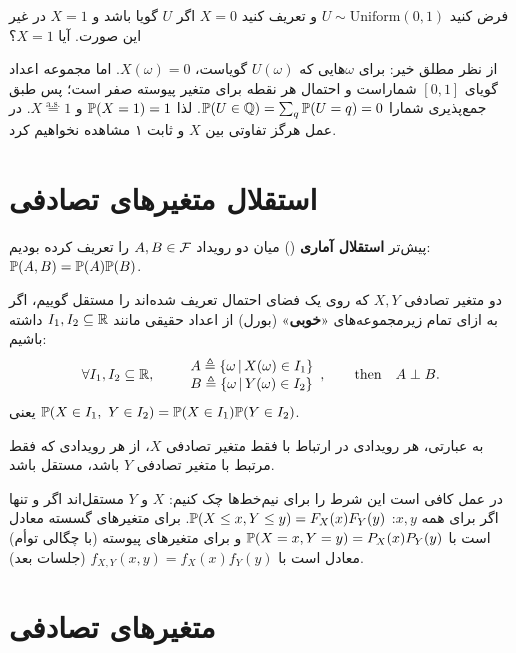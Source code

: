 \begin{example}
فرض کنید $U\sim\mathrm{Uniform}(0,1)$ و تعریف کنید $X=0$ اگر $U$ گویا باشد و $X=1$ در غیر این صورت. آیا $X=1$؟
\begin{solution}
از نظر مطلق خیر: برای $\omega$هایی که $U(\omega)$ گویاست، $X(\omega)=0$. اما مجموعه اعداد گویای $[0,1]$ شماراست و احتمال هر نقطه برای متغیر پیوسته صفر است؛ پس طبق جمع‌پذیری شمارا $\mathbb{P}(U\in\mathbb Q)=\sum_{q}\mathbb{P}(U=q)=0$. لذا $\mathbb{P}(X=1)=1$ و $X\overset{\text{a.s.}}{=}1$. در عمل هرگز تفاوتی بین $X$ و ثابت ۱ مشاهده نخواهیم کرد.
\end{solution}
\end{example}

\section{استقلال متغیرهای تصادفی}

پیش‌تر \textbf{استقلال آماری} () میان دو رویداد $A,B\in\mathcal{F}$ را تعریف کرده بودیم: $\mathbb{P}(A,B)=\mathbb{P}(A)\mathbb{P}(B)$.

\begin{definition}
دو متغیر تصادفی $X,Y$ که روی یک فضای احتمال تعریف شده‌اند را مستقل گوییم، اگر به ازای تمام زیرمجموعه‌های «\textbf{خوبی}» (بورل) از اعداد حقیقی مانند $I_1,I_2\subseteq\mathbb{R}$ داشته باشیم:
\[
\forall I_1,I_2\subseteq\mathbb{R},\qquad
\begin{array}{l}A\triangleq\{\omega\,|\, X(\omega)\in I_1\}\\ B\triangleq\{\omega\,|\, Y(\omega)\in I_2\}\end{array},\qquad\text{then}\quad A\perp B .
\]
یعنی $\mathbb{P}(X\in I_1,\ Y\in I_2)=\mathbb{P}(X\in I_1)\mathbb{P}(Y\in I_2)$.
\end{definition}

به عبارتی، هر رویدادی در ارتباط با فقط متغیر تصادفی $X$، از هر رویدادی که فقط مرتبط با متغیر تصادفی $Y$ باشد، مستقل باشد.

\begin{note}
\notetitle در عمل کافی است این شرط را برای نیم‌خط‌ها چک کنیم: $X$ و $Y$ مستقل‌اند اگر و تنها اگر برای همه $x,y$:
$\mathbb{P}(X\le x,Y\le y)=F_X(x)F_Y(y)$. برای متغیرهای گسسته معادل است با $\mathbb{P}(X=x,Y=y)=P_X(x)P_Y(y)$ و برای متغیرهای پیوسته (با چگالی توأم) معادل است با $f_{X,Y}(x,y)=f_X(x)f_Y(y)$ (جلسات بعد).
\end{note}

\section{متغیرهای تصادفی }

